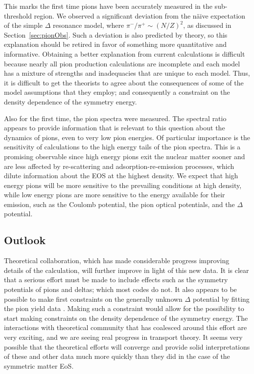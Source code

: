   This marks the first time pions have been accurately measured in the sub-threshold region. We observed a significant deviation from the  n\"aive expectation of the simple $\Delta$ resonance model, where $\pi^-/\pi^+ \sim (N/Z)^2$, as discussed in Section~\ref{sec:pionObs}. Such a deviation is also predicted by theory, so this explanation should be retired in favor of something more quantitative and informative. Obtaining a better explanation from current calculations is difficult because nearly all pion production calculations are incomplete and each model has a mixture of strengths and inadequacies that are unique to each model. Thus, it is difficult to get the theorists to agree about the consequences of some of the model assumptions that they employ; and consequently a constraint on the density dependence of the symmetry energy. 
  
  Also for the first time, the pion spectra were measured. The spectral ratio appears to provide information that is relevant to this question  about the dynamics of pions, even to very low pion energies. Of particular importance is the sensitivity of calculations to the high energy tails of the pion spectra. This is a promising observable since high energy pions  exit the nuclear matter sooner and are less affected by re-scattering and adsorption-re-emission processes, which dilute information about the EOS at the highest density. We expect that high energy pions will be more sensitive to the prevailing conditions at high density, while low energy pions are more sensitive to the energy available for their emission, such as the Coulomb potential, the pion optical potentials, and the $\Delta$ potential. 


\subsection{Outlook}
Theoretical collaboration, which has made considerable progress improving details of the calculation, will further improve in light of this new data. It is clear that a serious effort must be made to include effects such as the symmetry potentials of pions and deltas; which most codes do not. It also appears to be possible to make first constraints on the generally unknown $\Delta$ potential by fitting the pion yield data \cite{cozmaPC}. Making such a constraint would allow for the possibility to start making constraints on the density dependence of the symmetry energy. The interactions with theoretical community that has coalesced around this effort are very exciting, and we are seeing real progress in transport theory. It seems very possible that the theoretical efforts will converge and provide solid interpretations of these and other data much more quickly than they did in the case of the symmetric matter EoS. 

